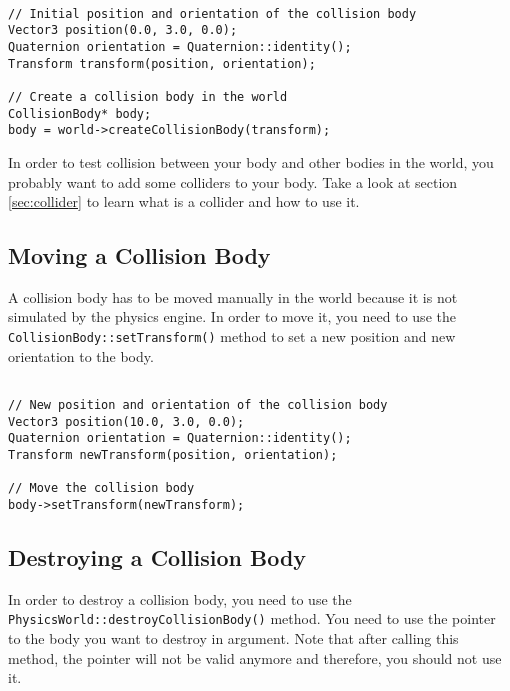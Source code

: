 \documentclass[a4paper,12pt]{article}
\begin{document}
    \begin{lstlisting}

// Initial position and orientation of the collision body
Vector3 position(0.0, 3.0, 0.0);
Quaternion orientation = Quaternion::identity();
Transform transform(position, orientation);

// Create a collision body in the world
CollisionBody* body;
body = world->createCollisionBody(transform);
  \end{lstlisting}

    \vspace{0.6cm}

    In order to test collision between your body and other bodies in the world, you probably want to add some colliders to your body.
    Take a look at section \ref{sec:collider} to learn what is a collider and how to use it.

    \subsection{Moving a Collision Body}

    A collision body has to be moved manually in the world because it is not simulated by the physics engine. In order to move it, you need to
    use the \texttt{CollisionBody::setTransform()} method to set a new position and new orientation to the body. \\

     \begin{lstlisting}

// New position and orientation of the collision body
Vector3 position(10.0, 3.0, 0.0);
Quaternion orientation = Quaternion::identity();
Transform newTransform(position, orientation);

// Move the collision body
body->setTransform(newTransform);
  \end{lstlisting}

    \subsection{Destroying a Collision Body}

    \begin{sloppypar}
    In order to destroy a collision body, you need to use the \texttt{PhysicsWorld::destroyCollisionBody()} method. You need to use the pointer to the
    body you want to destroy in argument. Note that after calling this method, the pointer will not be valid anymore and therefore, you should not use it. \\
    \end{sloppypar}
\end{document}
